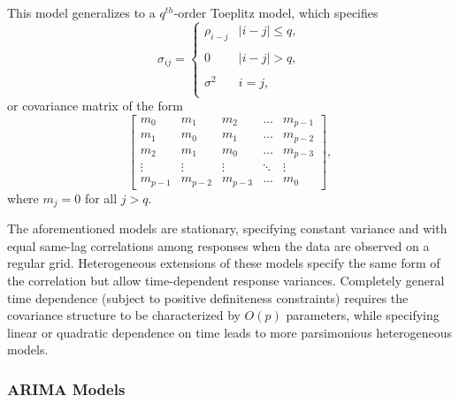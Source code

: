 This model generalizes to a $q^{th}$-order Toeplitz model, which specifies
\begin{equation} \label{eq:toeplitz-covariance-model}
\sigma_{ij} = \left\{ \begin{array}{ll}
\rho_{i-j} & \vert i - j \vert\le q, \\ 
&\\
0 & \vert i - j \vert >  q, \\ 
& \\
\sigma^2  & i = j,\\
\end{array}\right.
\end{equation}
\noindent
or covariance matrix of the form
\begin{equation} \label{eq:toeplitz-covariance-matrix}
\begin{bmatrix} m_0 & m_1 & m_2 & \dots & m_{p-1}\\ m_1 & m_0 & m_1 & \dots & m_{p-2}\\m_2 & m_1 & m_0 & \dots & m_{p-3}\\ \vdots & \vdots & \vdots & \ddots & \vdots\\  m_{p-1} & m_{p-2} & m_{p-3} & \dots & m_0 \end{bmatrix}, 
\end{equation}
\noindent
where $m_j = 0$ for all $j > q$. %

\bigskip

The aforementioned models are stationary, specifying constant variance and with equal same-lag correlations among responses when the data are observed on a regular grid. Heterogeneous extensions of these models specify the same form of the correlation but allow time-dependent response variances. Completely general time dependence (subject to positive definiteness constraints) requires the covariance structure to be characterized by $O\left(p\right)$ parameters, while specifying linear or quadratic dependence on time leads to more parsimonious heterogeneous models. 

\subsubsection{ARIMA Models}

